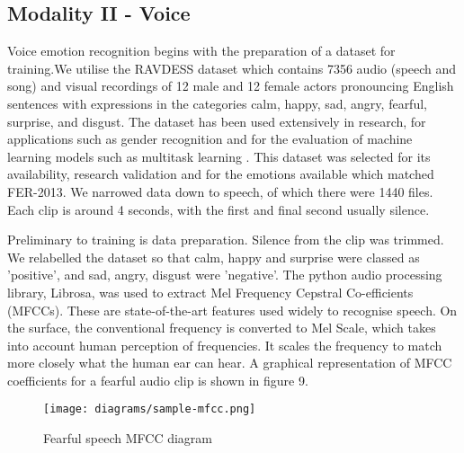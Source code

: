 \documentclass[12pt,a4paper]{article}
\begin{document}
\subsection{Modality II - Voice}
Voice emotion recognition begins with the preparation of a dataset for training.We utilise the RAVDESS dataset \cite{livingstone2018ryerson} which contains 7356 audio (speech and song) and visual recordings of 12 male and 12 female actors pronouncing English sentences with expressions in the categories calm, happy, sad, angry, fearful, surprise, and disgust. The dataset has been used extensively in research, for applications such as gender recognition and for the evaluation of machine learning models such as multitask learning \cite{zhang2016cross}. This dataset was selected for its availability, research validation and for the emotions available which matched  FER-2013. We narrowed data down to speech, of which there were 1440 files. Each clip is around 4 seconds, with the first and final second usually silence.

Preliminary to training is data preparation. Silence from the clip was trimmed. We relabelled the dataset so that calm, happy and surprise were classed as 'positive', and sad, angry, disgust were 'negative'. The python audio processing library, Librosa, was used to extract Mel Frequency Cepstral Co-efficients (MFCCs). These are state-of-the-art features used widely to recognise speech. On the surface, the conventional frequency is converted to Mel Scale, which takes into account human perception of frequencies. It scales the frequency to match more closely what the human ear can hear. A graphical representation of MFCC coefficients for a fearful audio clip is shown in figure 9.

\begin{figure}[h]
	\centerline{\texttt{[image: diagrams/sample-mfcc.png]}}
	\caption{Fearful speech MFCC diagram}
\end{figure}
\end{document}
